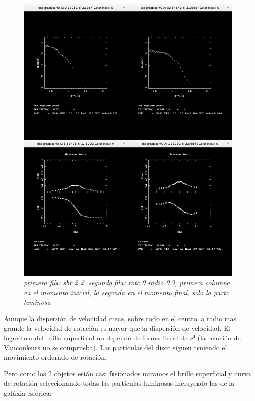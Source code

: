 \documentclass[12pt]{article} %
\renewcommand{\=}[1]{\stackrel{#1}{=}} %
\theoremstyle{definition}
\theoremstyle{remark}
\begin{document}
\begin{figure}[!ht]
 \centering
 \includegraphics[scale=0.3]{noraellip.png}
 \caption{\emph{primera fila: sbr 2 2, segunda fila: rotc 0 radio 0.3, primera columna en el momento inicial, la segunda en el momento final, solo la parte luminosa  }}
\end{figure}

Aunque la dispersión de velocidad crece, sobre todo en el centro, a radio mas grande la velocidad de rotación es mayor que la dispersión de velocidad. El logaritmo del brillo superficial no depende de forma lineal de $r^4$ (la relación de  Vaucouleurs no se comprueba).
Las partículas del disco siguen teniendo el movimiento ordenado de rotación.

Pero como los 2 objetos están casi fusionados miramos el brillo superficial y curva de rotación seleccionando todas las partículas luminosas incluyendo las de la galáxia esférica:
\end{document}
